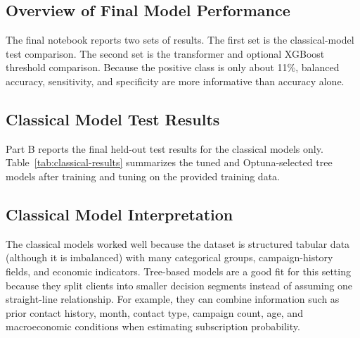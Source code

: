 \documentclass[10pt,twocolumn]{article}
\begin{document}
\subsection{Overview of Final Model Performance}

The final notebook reports two sets of results. The first set is the classical-model test comparison. The second set is the transformer and optional XGBoost threshold comparison. Because the positive class is only about 11\%, balanced accuracy, sensitivity, and specificity are more informative than accuracy alone.

\subsection{Classical Model Test Results}

Part B reports the final held-out test results for the classical models only. Table~\ref{tab:classical-results} summarizes the tuned and Optuna-selected tree models after training and tuning on the provided training data.

\begin{table}[t]
\centering
\scriptsize
{}
\caption{Classical model performance on the test set from \texttt{final.ipynb}.}
\label{tab:classical-results}
\end{table}

\subsection{Classical Model Interpretation}

The classical models worked well because the dataset is structured tabular data (although it is imbalanced) with many categorical groups, campaign-history fields, and economic indicators. Tree-based models are a good fit for this setting because they split clients into smaller decision segments instead of assuming one straight-line relationship. For example, they can combine information such as prior contact history, month, contact type, campaign count, age, and macroeconomic conditions when estimating subscription probability.
\end{document}
